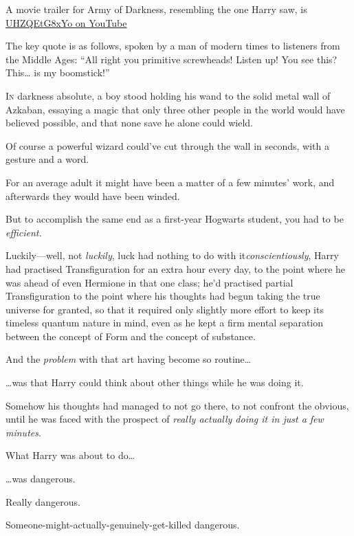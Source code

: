 
\begin{chapterOpeningAuthorNote}
A movie trailer for Army of Darkness, resembling the one Harry saw, is \href{https://www.youtube.com/watch?v=UHZQEtG8xYo}{UHZQEtG8xYo on YouTube} 

The key quote is as follows, spoken by a man of modern times to listeners from the Middle Ages:
“All right you primitive screwheads! Listen up! You see this? This… is my boomstick!”
\end{chapterOpeningAuthorNote}

\lettrine{I}{n} darkness absolute, a boy stood holding his wand to the solid metal wall of Azkaban, essaying a magic that only three other people in the world would have believed possible, and that none save he alone could wield.

Of course a powerful wizard could’ve cut through the wall in seconds, with a gesture and a word.

For an average adult it might have been a matter of a few minutes’ work, and afterwards they would have been winded.

But to accomplish the same end as a first-year Hogwarts student, you had to be \emph{efficient.}

Luckily—well, not \emph{luckily}, luck had nothing to do with
it\emdashhyp\emph{conscientiously}, Harry had practised Transfiguration for an extra hour every day, to the point where he was ahead of even Hermione in that one class; he’d practised partial Transfiguration to the point where his thoughts had begun taking the true universe for granted, so that it required only slightly more effort to keep its timeless quantum nature in mind, even as he kept a firm mental separation between the concept of Form and the concept of substance.

And the \emph{problem} with that art having become so routine…

…was that Harry could think about other things while he was doing it.

Somehow his thoughts had managed to not go there, to not confront the obvious, until he was faced with the prospect of \emph{really actually doing it in just a few minutes}.

What Harry was about to do…

…was dangerous.

Really dangerous.

Someone-might-actually-genuinely-get-killed dangerous.

